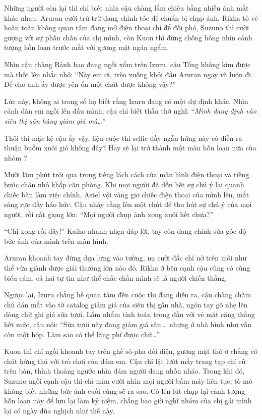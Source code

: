 \documentclass[../main.tex]{subfiles}
\begin{document}
Những người còn lại thì chỉ biết nhìn cậu chàng lắm chiêu bằng nhiều ánh mắt khác nhau: Aruran cười trừ trừ đang chỉnh tóc để chuẩn bị chụp ảnh, Rikka tỏ vẻ hoàn toàn không quan tâm đang mở điện thoại chỉ để đối phó, Suzuno thì cười gượng với sự phấn chấn của chị mình, còn Kuon thì đứng chống hông nhìn cảnh tượng hỗn loạn trước mắt với gương mặt ngán ngẩm.

Nhìn cậu chàng Bảnh bao đang ngồi xổm trên Izuru, cậu Tổng không kìm được mà thốt lên nhắc nhở: ``Này em ơi, trèo xuống khỏi đầu Aruran ngay và luôn đi. Để cho anh ấy được yên ổn một chút được không vậy?''

Lúc này, không ai trong số họ biết rằng Izuru đang có một dự định khác. Nhìn cảnh đàn em ngồi lên đầu mình, cậu chỉ biết thẫn thờ nghĩ: ``\textit{Mình đang định vào siêu thị săn hàng giảm giá mà\dots}''

Thôi thì mặc kệ cậu ấy vậy, liệu cuộc thi selfie đầy ngẫu hứng này có diễn ra thuận buồm xuôi gió không đây? Hay sẽ lại trở thành một màn hỗn loạn nữa của nhóm \hls?

\ct

Mười lăm phút trôi qua trong tiếng lách cách của màn hình điện thoại và tiếng bước chân nhỏ khắp căn phòng. Khi mọi người đã dồn hết sự chú ý lại quanh chiếc bàn làm việc chính, Astel vội vàng giơ chiếc điện thoại của mình lên, mắt sáng rực đầy háo hức. Cậu nhảy cẫng lên một chút để thu hút sự chú ý của mọi người, rồi cất giọng lớn: ``Mọi người chụp ảnh xong xuôi hết chưa?''

``Chị xong rồi đây!'' Kaiho nhanh nhẹn đáp lời, tay còn đang chỉnh sửa góc độ bức ảnh của mình trên màn hình.

Aruran khoanh tay đứng dựa lưng vào tường, nụ cười đắc chí nở trên môi như thể vừa giành được giải thưởng lớn nào đó. Rikka ở bên cạnh cậu cũng có cùng biểu cảm, cả hai tự tin như thể chắc chắn mình sẽ là người chiến thắng.

Ngược lại, Izuru chẳng hề quan tâm đến cuộc thi đang diễn ra, cậu chàng chăm chú dán mắt vào tờ catalog giảm giá của siêu thị gần nhà, ngón tay gõ nhẹ lên dòng chữ ghi giá sữa tươi. Lẩm nhẩm tính toán trong đầu với vẻ mặt căng thẳng hết mức, cậu nói: ``Sữa tươi này đang giảm giá sâu\dots\ nhưng ở nhà hình như vẫn còn một hộp. Làm sao có thể lãng phí được chứ\dots''


Kuon thì chỉ ngồi khoanh tay trên ghế sô-pha đối diện, gương mặt thờ ơ chẳng có chút hứng thú với trò chơi của đám em. Cậu chỉ lật lướt mấy trang tạp chí cũ trên bàn, thỉnh thoảng ngước nhìn đám người đang nhốn nháo. Trong khi đó, Suzuno ngồi cạnh cậu thì chỉ mỉm cười nhìn mọi người bấm máy liên tục, tò mò không biết những bức ảnh cuối cùng sẽ ra sao. Cô lén lút chụp lại cảnh tượng hỗn loạn này để lưu lại làm kỷ niệm, chẳng bao giờ nghĩ nhóm của chị gái mình lại có ngày đùa nghịch như thế này.
\end{document}
